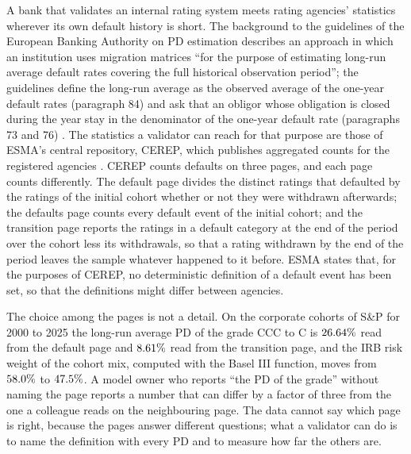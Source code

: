A bank that validates an internal rating system meets rating agencies' statistics wherever its own default history is short. The background to the guidelines of the European Banking Authority on PD estimation describes an approach in which an institution uses migration matrices ``for the purpose of estimating long-run average default rates covering the full historical observation period''; the guidelines define the long-run average as the observed average of the one-year default rates (paragraph 84) and ask that an obligor whose obligation is closed during the year stay in the denominator of the one-year default rate (paragraphs 73 and 76) \citep{EBA_2017}. The statistics a validator can reach for that purpose are those of ESMA's central repository, CEREP, which publishes aggregated counts for the registered agencies \citep{ESMA_CEREP}. CEREP counts defaults on three pages, and each page counts differently. The default page divides the distinct ratings that defaulted by the ratings of the initial cohort whether or not they were withdrawn afterwards; the defaults page counts every default event of the initial cohort; and the transition page reports the ratings in a default category at the end of the period over the cohort less its withdrawals, so that a rating withdrawn by the end of the period leaves the sample whatever happened to it before. ESMA states that, for the purposes of CEREP, no deterministic definition of a default event has been set, so that the definitions might differ between agencies. %

The choice among the pages is not a detail. On the corporate cohorts of S\&P for 2000 to 2025 the long-run average PD of the grade CCC to C is $26.64\%$ read from the default page and $8.61\%$ read from the transition page, and the IRB risk weight of the cohort mix, computed with the Basel III function, moves from $58.0\%$ to $47.5\%$. A model owner who reports ``the PD of the grade'' without naming the page reports a number that can differ by a factor of three from the one a colleague reads on the neighbouring page. The data cannot say which page is right, because the pages answer different questions; what a validator can do is to name the definition with every PD and to measure how far the others are.

